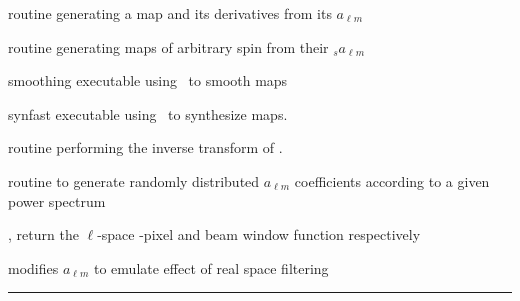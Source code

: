 \begin{related}
  \begin{sulist}{} %
   \item[\htmlref{alm2map\_der}{sub:alm2map_der}] routine generating a map and
   its derivatives from its $a_{\ell m}$
   \item[\htmlref{alm2map\_spin}{sub:alm2map_spin}] routine generating maps of
arbitrary spin from their  ${_s}a_{\ell m}$
  \item[smoothing] executable using \thedocid\ to smooth maps
  \item[synfast] executable using \thedocid\ to synthesize maps.
  \item[\htmlref{map2alm}{sub:map2alm}] routine performing the inverse transform
  of \thedocid.
  \item[\htmlref{create\_alm}{sub:create_alm}] routine to generate randomly
  distributed $a_{\ell m}$ coefficients according to a given power spectrum
  \item[\htmlref{pixel\_window}{sub:pixel_window},
\htmlref{generate\_beam}{sub:generate_beam}] return the $\ell$-space \healpix-pixel and beam window function respectively
  \item[\htmlref{alter\_alm}{sub:alter_alm}] modifies $a_{\ell m}$ to emulate effect
of real space filtering
  \end{sulist}
\end{related}

\rule{\hsize}{2mm}

\newpage
